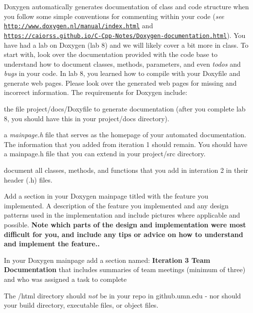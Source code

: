 Doxygen automatically generates documentation of class and code structure when you follow some simple conventions for commenting within your code ({\itshape see} \href{http://www.doxygen.nl/manual/index.html}{\tt http\+://www.\+doxygen.\+nl/manual/index.\+html} and \href{https://caiorss.github.io/C-Cpp-Notes/Doxygen-documentation.html}{\tt https\+://caiorss.\+github.\+io/\+C-\/\+Cpp-\/\+Notes/\+Doxygen-\/documentation.\+html}). You have had a lab on Doxygen (lab 8) and we will likely cover a bit more in class. To start with, look over the documentation provided with the code base to understand how to document classes, methods, parameters, and even {\itshape todo\textquotesingle{}s} and {\itshape bugs} in your code. In lab 8, you learned how to compile with your Doxyfile and generate web pages. Please look over the generated web pages for missing and incorrect information. The requirements for Doxygen include\+:


\begin{DoxyItemize}
\item the file {\ttfamily project/docs/\+Doxyfile} to generate documentation (after you complete lab 8, you should have this in your {\ttfamily project/docs} directory).
\item a {\itshape mainpage.\+h} file that serves as the homepage of your automated documentation. The information that you added from iteration 1 should remain. You should have a mainpage.\+h file that you can extend in your {\ttfamily project/src} directory.
\item document all classes, methods, and functions that you add in interation 2 in their header (.h) files.
\item Add a section in your Doxygen mainpage titled with the feature you implemented. A description of the feature you implemented and any design patterns used in the implementation and include pictures where applicable and possible. {\bfseries Note which parts of the design and implementation were most difficult for you, and include any tips or advice on how to understand and implement the feature..}
\item In your Doxygen mainpage add a section named\+: {\bfseries Iteration 3 Team Documentation} that includes summaries of team meetings (minimum of three) and who was assigned a task to complete
\item The /html directory should {\itshape not} be in your repo in github.\+umn.\+edu -\/ nor should your build directory, executable files, or object files.
\end{DoxyItemize}

